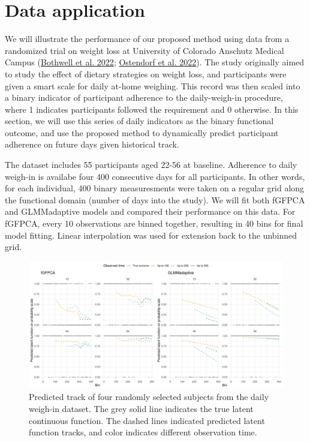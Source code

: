 \documentclass[
  11pt,
]{article}
\begin{document}
\hypertarget{data-application}{%
\section{Data application}\label{data-application}}

We will illustrate the performance of our proposed method using data
from a randomized trial on weight loss at University of Colorado
Anschutz Medical Campus (\protect\hyperlink{ref-bothwell2022}{Bothwell
et al. 2022}; \protect\hyperlink{ref-ostendorf2022}{Ostendorf et al.
2022}). The study originally aimed to study the effect of dietary
strategies on weight loss, and participants were given a smart scale for
daily at-home weighing. This record was then scaled into a binary
indicator of participant adherence to the daily-weigh-in procedure,
where 1 indicates participants followed the requirement and 0 otherwise.
In this section, we will use this series of daily indicators as the
binary functional outcome, and use the proposed method to dynamically
predict participant adherence on future days given historical track.

The dataset includes 55 participants aged 22-56 at baseline. Adherence
to daily weigh-in is availabe four 400 consecutive days for all
participants. In other words, for each individual, 400 binary
measuresments were taken on a regular grid along the functional domain
(number of days into the study). We will fit both fGFPCA and
GLMMadaptive models and compared their performance on this data. For
fGFPCA, every 10 observations are binned together, resulting in 40 bins
for final model fitting. Linear interpolation was used for extension
back to the unbinned grid.

\begin{figure}
\centering
\includegraphics{Manuscript_files/figure-latex/Figure_appl-1.pdf}
\caption{Predicted track of four randomly selected subjects from the
daily weigh-in dataset. The grey solid line indicates the true latent
continuous function. The dashed lines indicated predicted latent
function tracks, and color indicates different observation time.}
\end{figure}
\end{document}
